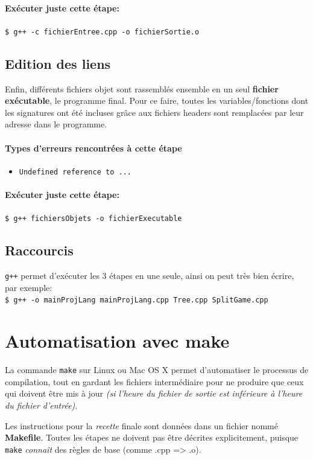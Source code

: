 \documentclass[a4paper]{article}
\begin{document}
\paragraph{Exécuter juste cette étape:} 
\lstinline{$ g++ -c fichierEntree.cpp -o fichierSortie.o}

\subsection {Edition des liens}
Enfin, différents fichiers objet sont rassemblés ensemble en un seul \textbf{fichier exécutable}, le programme final. Pour ce faire, toutes les variables/fonctions dont les signatures ont été incluses grâce aux fichiers headers sont remplacées par leur adresse dans le programme.
\paragraph{Types d'erreurs rencontrées à cette étape}
\begin{itemize}
	\item \texttt{Undefined reference to ...}
\end{itemize}
\paragraph{Exécuter juste cette étape:} 
\lstinline{$ g++ fichiersObjets -o fichierExecutable}

\subsection{Raccourcis}
\lstinline{g++} permet d'exécuter les 3 étapes en une seule, ainsi on peut très bien écrire, par exemple: \\
\lstinline{$ g++ -o mainProjLang mainProjLang.cpp Tree.cpp SplitGame.cpp}

\section{Automatisation avec make}
La commande \lstinline{make} sur Linux ou Mac OS X permet d'automatiser le processus de compilation, tout en gardant les fichiers intermédiaire pour ne produire que ceux qui doivent être mis à jour \textit{(si l'heure du fichier de sortie est inférieure à l'heure du fichier d'entrée)}.

Les instructions pour la \textit{recette} finale sont données dans un fichier nommé \textbf{Makefile}. Toutes les étapes ne doivent pas être décrites explicitement, puisque \lstinline{make} \textit{connaît} des règles de base (comme .cpp => .o).
\end{document}
